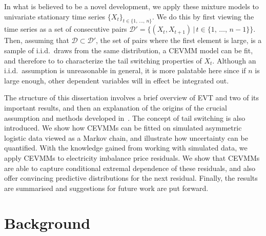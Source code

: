 \documentclass[11pt,twoside,openany]{book}
\newcommand{\D}{\mathcal{D}}
\numberwithin{Theorem}{chapter}
\numberwithin{Definition}{chapter}
\numberwithin{Lemma}{chapter}
\numberwithin{Algorithm}{chapter}
\numberwithin{equation}{chapter}
\begin{document}
In what is believed to be a novel development, we apply these mixture models to
univariate stationary time series $\{X_t\}_{t\in \{1,\,\ldots,\,n\}}$. We do
this by first viewing the time series as a set of consecutive pairs $\D' =
\{(X_{t},X_{t+1})\,|\,t\in\{1,\,\ldots,\,n-1\}\}$. Then, assuming that
$\D\subset \D'$, the set of pairs where the first element is large, is a sample
of i.i.d.\ draws from the same distribution, a CEVMM model can be fit, and
therefore to to characterize the tail switching properties of $X_t$.
Although an i.i.d.\ assumption is unreasonable in general, it is more palatable
here since if $n$ is large enough, other dependent variables will in effect be
integrated out.

The structure of this dissertation involves a brief overview of EVT and two of
its important results, and then an explanation of the origins of the crucial
assumption and methods developed in~\cite{heffernan2004conditional}. The
concept of tail switching is also introduced. We show how CEVMMs can be fitted
on simulated asymmetric logistic data viewed as a Markov chain, and illustrate
how uncertainty can be quantified. With the knowledge gained from working with
simulated data, we apply CEVMMs to electricity imbalance price residuals.
We show that CEVMMs are able to capture conditional extremal dependence of these
residuals, and also offer convincing predictive distributions for
the next residual.
Finally, the results are summarised and suggestions for future work are put forward.





\cleardoublepage %


\chapter{Background}
\label{sec:background}
\end{document}
